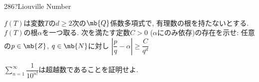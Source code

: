 \begin{thm}{286}{\hosi ?}{Liouville Number}
    \ben
    \item $f(T)$は変数$T$の$d\geq 2$次の$\mb{Q}$係数多項式で, 有理数の根を持たないとする. $f(T)$の根$\alpha$を一つ取る. 次を満たす定数$C>0$ ($\alpha$にのみ依存)の存在を示せ: 任意の$p\in \mb{Z}$, $q\in \mb{N}$に対し $\left|\dfrac{p}{q} - \alpha\right| \geq \dfrac{C}{q^d}$
    \item $\sum_{n=1}^{\infty} \dfrac{1}{10^{n!}}$は超越数であることを証明せよ. 
    \een 
\end{thm}
